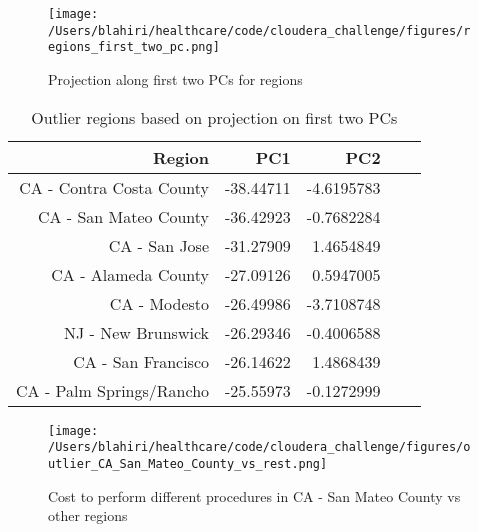 \begin{figure}[!h]
    \centering
    \texttt{[image: /Users/blahiri/healthcare/code/cloudera\_challenge/figures/regions\_first\_two\_pc.png]}
    \caption{\small Projection along first two PCs for regions}
    \label{fig:regions_first_two_pc}
\end{figure}  

\begin{table*}[!h]
\centering
\caption{Outlier regions based on projection on first two PCs}
\begin{tabular}{rrrll}
\hline
Region & PC1 & PC2\\
\hline
CA - Contra Costa County & -38.44711 & -4.6195783\\
CA - San Mateo County    & -36.42923 & -0.7682284\\
CA - San Jose            & -31.27909 & 1.4654849\\
CA - Alameda County      & -27.09126 & 0.5947005\\
CA - Modesto             & -26.49986 &-3.7108748\\
NJ - New Brunswick       & -26.29346 &-0.4006588\\
CA - San Francisco       & -26.14622 & 1.4868439\\
CA - Palm Springs/Rancho & -25.55973 &-0.1272999\\
\hline
\end{tabular}
\label{tab:regions_first_two_pc}
\end{table*}

\begin{figure*}[!h]
    \centering
    \texttt{[image: /Users/blahiri/healthcare/code/cloudera\_challenge/figures/outlier\_CA\_San\_Mateo\_County\_vs\_rest.png]}
    \caption{\small Cost to perform different procedures in CA - San Mateo County vs other regions}
    \label{fig:outlier_CA_San_Mateo_County_vs_rest}
\end{figure*} 


